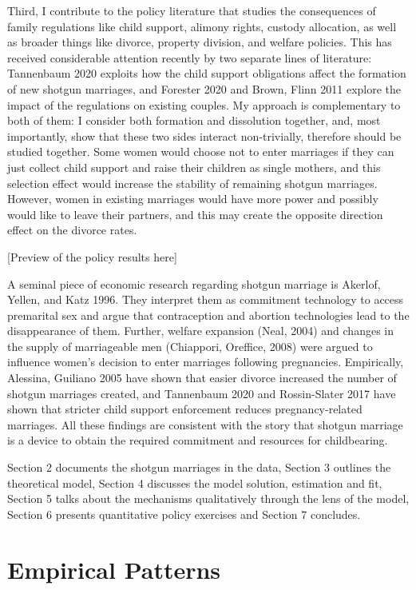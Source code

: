 \documentclass[12pt,letter]{article}
\begin{document}
Third, I contribute to the policy literature that studies the consequences of family regulations like child support, alimony rights, custody allocation, as well as broader things like divorce, property division, and welfare policies. This has received considerable attention recently by two separate lines of literature: Tannenbaum 2020 exploits how the child support obligations affect the formation of new shotgun marriages, and Forester 2020 and Brown, Flinn 2011 explore the impact of the regulations on existing couples. My approach is complementary to both of them: I consider both formation and dissolution together, and, most importantly, show that these two sides interact non-trivially, therefore should be studied together. Some women would choose not to enter marriages if they can just collect child support and raise their children as single mothers, and this selection effect would increase the stability of remaining shotgun marriages. However, women in existing marriages would have more power and possibly would like to leave their partners, and this may create the opposite direction effect on the divorce rates.

[Preview of the policy results here]

A seminal piece of economic research regarding shotgun marriage is Akerlof, Yellen, and Katz 1996. They interpret them as commitment technology to access premarital sex and argue that contraception and abortion technologies lead to the disappearance of them. Further, welfare expansion (Neal, 2004) and changes in the supply of marriageable men (Chiappori, Oreffice, 2008) were argued to influence women's decision to enter marriages following pregnancies. Empirically, Alessina, Guiliano 2005 have shown that easier divorce increased the number of shotgun marriages created, and Tannenbaum 2020 and Rossin-Slater 2017 have shown that stricter child support enforcement reduces pregnancy-related marriages. All these findings are consistent with the story that shotgun marriage is a device to obtain the required commitment and resources for childbearing.

Section 2 documents the shotgun marriages in the data, Section 3 outlines the theoretical model, Section 4 discusses the model solution, estimation and fit, Section 5 talks about the mechanisms qualitatively through the lens of the model, Section 6 presents quantitative policy exercises and Section 7 concludes.

\section{Empirical Patterns}
%
\end{document}
